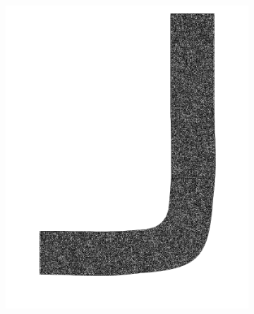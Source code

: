 \begin{figure}[H]
\begin{subfigure}{0.3\linewidth}
		\includegraphics[scale=0.18]{figs/pipe/pipe_mesh.png}
		\caption{}
		\label{fig:referenceSolutionsPipeMesh}
	\end{subfigure}\\
	\begin{subfigure}{0.3\linewidth}
		\centering

\end{subfigure}
\end{figure}
